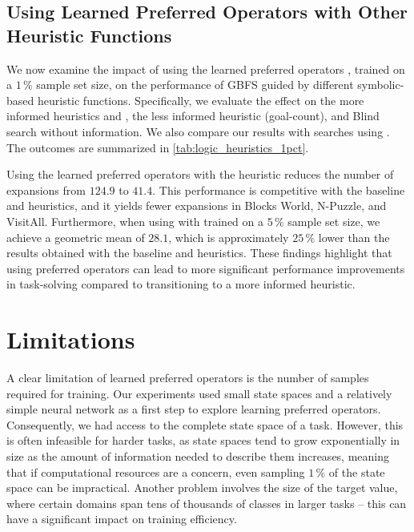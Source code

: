 \documentclass[ppgc,diss,english]{iiufrgs}
\begin{document}



\section{Using Learned Preferred Operators with Other Heuristic Functions}
\label{sec:other-heuristic-functions}
We now examine the impact of using the learned preferred operators \pog, trained on a $1\,\%$ sample set size, on the performance of GBFS guided by different symbolic-based heuristic functions. Specifically, we evaluate the effect on the more informed heuristics \hff and \hadd, the less informed heuristic \hgc (goal-count), and Blind search without information. We also compare our results with searches using \poff. The outcomes are summarized in \cref{tab:logic_heuristics_1pct}.



Using the learned preferred operators \pog with the \hgc heuristic reduces the number of expansions from $124.9$ to $41.4$. This performance is competitive with the baseline \hff and \hadd heuristics, and it yields fewer expansions in Blocks World, N-Puzzle, and VisitAll. Furthermore, when using \hgc with \pog trained on a $5\,\%$ sample set size, we achieve a geometric mean of $28.1$, which is approximately $25\,\%$ lower than the results obtained with the baseline \hff and \hadd heuristics. These findings highlight that using preferred operators can lead to more significant performance improvements in task-solving compared to transitioning to a more informed heuristic.


\chapter{Limitations}
\label{cha:limitations}
A clear limitation of learned preferred operators is the number of samples required for training. Our experiments used small state spaces and a relatively simple neural network as a first step to explore learning preferred operators. Consequently, we had access to the complete state space of a task. However, this is often infeasible for harder tasks, as state spaces tend to grow exponentially in size as the amount of information needed to describe them increases, meaning that if computational resources are a concern, even sampling $1\,\%$ of the state space can be impractical. Another problem involves the size of the target value, where certain domains span tens of thousands of classes in larger tasks -- this can have a significant impact on training efficiency.
\end{document}
